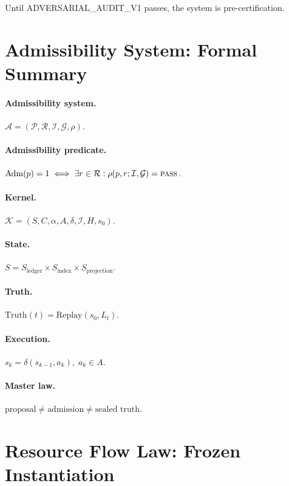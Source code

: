 \documentclass[11pt,a4paper]{article}
\theoremstyle{plain}
\theoremstyle{definition}
\theoremstyle{remark}
\newcommand{\Adm}{\mathrm{Adm}}
\newcommand{\Replay}{\mathrm{Replay}}
\newcommand{\PASS}{\textsc{pass}}
\newcommand{\kernel}{\mathcal{K}}
\newcommand{\Prop}{\mathcal{P}}
\newcommand{\Rec}{\mathcal{R}}
\newcommand{\Inv}{\mathcal{I}}
\newcommand{\Gate}{\mathcal{G}}
\newcommand{\red}{\rho}
\newcommand{\admsys}{\mathcal{A}}
\begin{document}
Until ADVERSARIAL\_AUDIT\_V1 passes, the system is pre-certification.

\section{Admissibility System: Formal Summary}
\label{app:formal}

\paragraph{Admissibility system.}
$\admsys = (\Prop, \Rec, \Inv, \Gate, \red)$.

\paragraph{Admissibility predicate.}
$\Adm(p) = 1 \iff \exists r \in \Rec : \red(p, r; \Inv, \Gate) = \PASS$.

\paragraph{Kernel.}
$\kernel = (S, C, \alpha, A, \delta, \Inv, H, s_0)$.

\paragraph{State.}
$S = S_{\mathrm{ledger}} \times S_{\mathrm{index}} \times S_{\mathrm{projection}}$.

\paragraph{Truth.}
$\mathrm{Truth}(t) = \Replay(s_0, L_t)$.

\paragraph{Execution.}
$s_k = \delta(s_{k-1}, a_k),\; a_k \in A$.

\paragraph{Master law.}
$\text{proposal} \neq \text{admission} \neq \text{sealed truth}$.

\bigskip

\section{Resource Flow Law: Frozen Instantiation}
\label{app:resource-flow}
\end{document}
